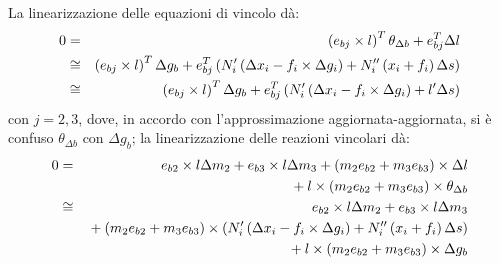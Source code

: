 \documentclass[12pt,dvips,fleqn,italian]{article}
\begin{document}
\noindent
La linearizzazione delle equazioni di vincolo d\`a:
\begin{eqnarray*}
	0 & = & \left( e_{bj}\times{l} \right)^T \theta_{\Delta{b}}
	+ e_{bj}^T \Delta{l} \\
	& \cong & \left( e_{bj}\times{l} \right)^T \Delta{g_b}
	+ e_{bj}^T\left( 
		N'_i \left( \Delta{x_i} - f_i\times\Delta{g_i} \right)
		+ N''_i \left( x_i + f_i \right) \Delta{s}
	 \right) \\
	& \cong & \left( e_{bj}\times{l} \right)^T \Delta{g_b}
	+ e_{bj}^T\left( 
		N'_i \left( \Delta{x_i} - f_i\times\Delta{g_i} \right)
		+ l' \Delta{s}
	 \right)
\end{eqnarray*}
con $j=2,3$, dove, in accordo con l'approssimazione aggiornata-aggiornata,
si \`e confuso $\theta_{\Delta{b}}$ con $\Delta{g_b}$; 
la linearizzazione delle reazioni vincolari d\`a:
\begin{eqnarray*}
	0 & = & e_{b2}\times{l} \Delta{m_2} + e_{b3}\times{l} \Delta{m_3} 
	+ \left( m_2 e_{b2} + m_3 e_{b3} \right)\times \Delta{l} \\
	& & \mbox{} 
	+ l\times\left( m_2 e_{b2} + m_3 e_{b3} \right)\times \theta_{\Delta{b}} \\
	& \cong & e_{b2}\times{l} \Delta{m_2} + e_{b3}\times{l} \Delta{m_3} \\
	&& \mbox{} + \left( m_2 e_{b2} + m_3 e_{b3} \right)\times \left( 
		N'_i \left( \Delta{x_i} - f_i\times\Delta{g_i} \right)
		+ N''_i \left( x_i + f_i \right) \Delta{s}
	 \right) \\
	& & \mbox{} + l\times\left( m_2 e_{b2} + m_3 e_{b3} \right)\times \Delta{g_b}
\end{eqnarray*}
\end{document}
